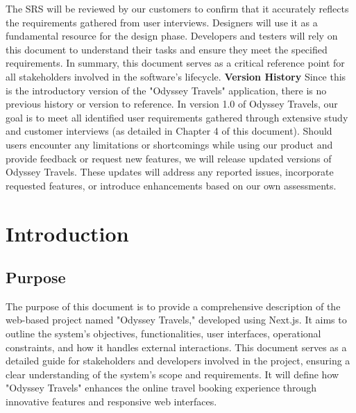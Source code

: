 \documentclass{scrreprt}
\begin{document}
The SRS will be reviewed by our customers to confirm that it accurately reflects the requirements gathered from user interviews. Designers will use it as a fundamental resource for the design phase. Developers and testers will rely on this document to understand their tasks and ensure they meet the specified requirements. In summary, this document serves as a critical reference point for all stakeholders involved in the software's lifecycle.
\newline
\newline
{\LARGE\textbf{Version History}}
\newline
\newline
Since this is the introductory version of the "Odyssey Travels" application, there is no previous history or version to reference. In version 1.0 of Odyssey Travels, our goal is to meet all identified user requirements gathered through extensive study and customer interviews (as detailed in Chapter 4 of this document).
Should users encounter any limitations or shortcomings while using our product and provide feedback or request new features, we will release updated versions of Odyssey Travels. These updates will address any reported issues, incorporate requested features, or introduce enhancements based on our own assessments.




\chapter{Introduction}

\section{Purpose}
The purpose of this document is to provide a comprehensive description of the web-based project named "Odyssey Travels," developed using Next.js. It aims to outline the system’s objectives, functionalities, user interfaces, operational constraints, and how it handles external interactions. This document serves as a detailed guide for stakeholders and developers involved in the project, ensuring a clear understanding of the system’s scope and requirements. It will define how "Odyssey Travels" enhances the online travel booking experience through innovative features and responsive web interfaces.
\end{document}
